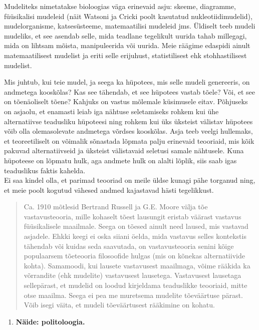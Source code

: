 \documentclass[]{book}
\providecommand{\tightlist}{%
  \setlength{\itemsep}{0pt}\setlength{\parskip}{0pt}}
\begin{document}
Mudeliteks nimetatakse bioloogias väga erinevaid asju: skeeme,
diagramme, füüsikalisi mudeleid (näit Watsoni ja Cricki poolt kasutatud
nukleotiidimudelid), mudelorganisme, katsesüsteeme, matemaatilisi
mudeleid jms. Üldiselt teeb mudeli mudeliks, et see asendab selle, mida
teadlane tegelikult uurida tahab millegagi, mida on lihtsam mõista,
manipuleerida või uurida. Meie räägime edaspidi ainult matemaatilisest
mudelist ja eriti selle erijuhust, statistilisest ehk stohhastilisest
mudelist.

Mis juhtub, kui teie mudel, ja seega ka hüpotees, mis selle mudeli
genereeris, on andmetega kooskõlas? Kas see tähendab, et see hüpotees
vastab tõele? Või, et see on tõenäoliselt tõene? Kahjuks on vastus
mõlemale küsimusele eitav. Põhjuseks on asjaolu, et enamasti leiab iga
nähtuse seletamiseks rohkem kui ühe alternatiivse teadusliku hüpoteesi
ning rohkem kui üks üksteist välistav hüpotees võib olla olemasolevate
andmetega võrdses kooskõlas. Asja teeb veelgi hullemaks, et
teoreetiliselt on võimalik sõnastada lõpmata palju erinevaid teooriaid,
mis kõik pakuvad alternatiivseid ja üksteist välistavaid seletusi samale
nähtusele. Kuna hüpoteese on lõpmatu hulk, aga andmete hulk on alalti
lõplik, siis saab igas teaduslikus faktis kahelda.\\
Ei saa kindel olla, et parimad teooriad on meile üldse kunagi pähe
torganud ning, et meie poolt kogutud vähesed andmed kajastavad hästi
tegelikkust.

\begin{quote}
Ca. 1910 mõtlesid Bertrand Russell ja G.E. Moore välja tõe
vastavusteooria, mille kohaselt tõest lausungit eristab väärast vastavus
füüsikalisele maailmale. Seega on tõesed ainult need laused, mis
vastavad asjadele. Ehkki keegi ei oska siiani öelda, mida vastavus
selles kontekstis tähendab või kuidas seda saavutada, on vastavusteooria
senini kõige populaarsem tõeteooria filosoofide hulgas (mis on kõnekas
alternatiivide kohta). Samamoodi, kui lausete vastavusest maailmaga,
võime rääkida ka võrrandite (ehk mudelite) vastavusest lausetega.
Vastavusest lausetaga sellepärast, et mudelid on loodud kirjeldama
teaduslikke teooriaid, mitte otse maailma. Seega ei pea me muretsema
mudelite tõeväärtuse pärast. Võib isegi väita, et mudeli tõeväärtusest
rääkimine on kohatu.
\end{quote}

\begin{enumerate}
\def\labelenumi{(\arabic{enumi})}
\tightlist
\item
  \textbf{Näide: politoloogia.}
\end{enumerate}
\end{document}
